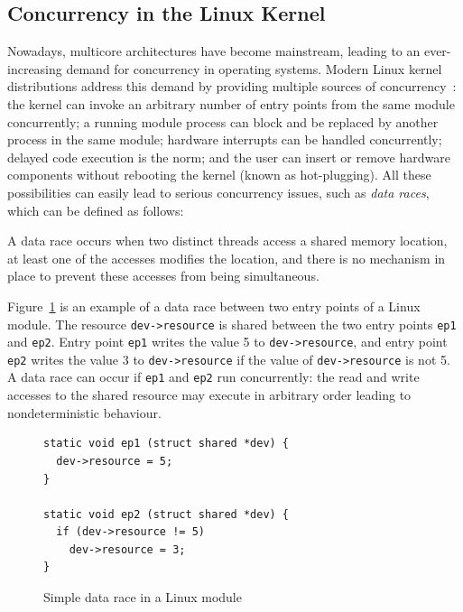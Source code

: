\subsection{Concurrency in the Linux Kernel}
\label{bg:concurrency}

Nowadays, multicore architectures have become mainstream, leading to an ever-increasing demand for concurrency in operating systems. Modern Linux kernel distributions address this demand by providing multiple sources of concurrency~\cite{corbet2005linux}: the kernel can invoke an arbitrary number of entry points from the same module concurrently; a running module process can block and be replaced by another process in the same module; hardware interrupts can be handled concurrently; delayed code execution is the norm; and the user can insert or remove hardware components without rebooting the kernel (known as hot-plugging). All these possibilities can easily lead to serious concurrency issues, such as \emph{data races}, which can be defined as follows:

\begin{definition}
\label{definition:datarace}
A data race occurs when two distinct threads access a shared memory location, at least one of the accesses modifies the location, and there is no mechanism in place to prevent these accesses from being simultaneous.
\end{definition}

Figure~\ref{fig:data_race_example} is an example of a data race between two entry points of a Linux module. The resource \texttt{dev->resource} is shared between the two entry points \texttt{ep1} and \texttt{ep2}. Entry point \texttt{ep1} writes the value 5 to \texttt{dev->resource}, and entry point \texttt{ep2} writes the value 3 to \texttt{dev->resource} if the value of \texttt{dev->resource} is not 5. A data race can occur if \texttt{ep1} and \texttt{ep2} run concurrently: the read and write accesses to the shared resource may execute in arbitrary order leading to nondeterministic behaviour.

\begin{figure}[!h]
\centering
\begin{lstlisting}
static void ep1 (struct shared *dev) {
  dev->resource = 5;
}

static void ep2 (struct shared *dev) {
  if (dev->resource != 5)
    dev->resource = 3;
}
\end{lstlisting}
\caption{Simple data race in a Linux module}
\label{fig:data_race_example}
\end{figure}

